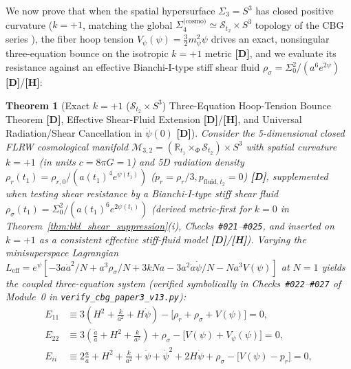 \documentclass[11pt,a4paper]{article}
\newcommand{\catD}{\textbf{\textcolor{blue!75!black}{[D]}}}
\newcommand{\catH}{\textbf{\textcolor{orange!85!black}{[H]}}}
\theoremstyle{plain}
\newtheorem{theorem}{Theorem}[section]
\theoremstyle{definition}
\theoremstyle{remark}
\numberwithin{equation}{section}
\begin{document}
We now prove that when the spatial hypersurface $\Sigma_3 = S^3$ has closed positive curvature ($k = +1$, matching the global $\Sigma_4^{\text{(cosmo)}} \simeq \mathcal{S}_{t_2} \times S^3$ topology of the CBG series \cite{jimenez2026_p0,jimenez2026a}), the fiber hoop tension $V_{\psi}(\psi) = \frac{3}{2}m_{\psi}^2\psi$ drives an exact, nonsingular three-equation bounce on the isotropic $k = +1$ metric \catD, and we evaluate its resistance against an effective Bianchi-I-type stiff shear fluid $\rho_{\sigma} = \Sigma_0^2/(a^6 e^{2\psi})$ \catD/\catH:

\begin{theorem}[Exact $k = +1$ ($\mathcal{S}_{t_2} \times S^3$) Three-Equation Hoop-Tension Bounce Theorem \catD, Effective Shear-Fluid Extension \catD/\catH, and Universal Radiation/Shear Cancellation in $\ddot{\psi}(0)$ \catD]
\label{thm:anisotropic_k1_bounce}
Consider the 5-dimensional closed FLRW cosmological manifold $\mathcal{M}_{3,2} = (\mathbb{R}_{t_1} \times_{\Phi} \mathcal{S}_{t_2}) \times S^3$ with spatial curvature $k = +1$ (in units $c = 8\pi G = 1$) and 5D radiation density $\rho_r(t_1) = \rho_{r,0}/(a(t_1)^4 e^{\psi(t_1)})$ ($p_r = \rho_r/3, p_{\text{fluid},t_2} = 0$) \catD, supplemented when testing shear resistance by a Bianchi-I-type stiff shear fluid $\rho_{\sigma}(t_1) = \Sigma_0^2/(a(t_1)^6 e^{2\psi(t_1)})$ (derived metric-first for $k = 0$ in Theorem~\ref{thm:bkl_shear_suppression}(i), Checks~\texttt{\#021}--\texttt{\#025}, and inserted on $k = +1$ as a consistent effective stiff-fluid model \catD/\catH). Varying the minisuperspace Lagrangian $L_{\text{eff}} = e^{\psi}[-3a\dot{a}^2/N + a^3\rho_{\sigma}/N + 3kNa - 3a^2\dot{a}\dot{\psi}/N - Na^3 V(\psi)]$ at $N = 1$ yields the coupled three-equation system (verified symbolically in Checks~\texttt{\#022}--\texttt{\#027} of Module~0 in \allowbreak\texttt{verify\_cbg\_paper3\_v13.py}):
\begin{subequations}
\label{eq:exact_3eq_aniso_system}
\begin{align}
  E_{11} &\equiv 3\left(H^2 + \frac{k}{a^2} + H\dot{\psi}\right) - \Big[\rho_r + \rho_{\sigma} + V(\psi)\Big] = 0, \label{eq:aniso_e11} \\[4pt]
  E_{22} &\equiv 3\left(\frac{\ddot{a}}{a} + H^2 + \frac{k}{a^2}\right) + \rho_{\sigma} - \Big[V(\psi) + V_{\psi}(\psi)\Big] = 0, \label{eq:aniso_e22} \\[4pt]
  E_{ii} &\equiv 2\frac{\ddot{a}}{a} + H^2 + \frac{k}{a^2} + \ddot{\psi} + \dot{\psi}^2 + 2H\dot{\psi} + \rho_{\sigma} - \Big[V(\psi) - p_r\Big] = 0,
  \label{eq:aniso_eii}

\end{align}
\end{subequations}
\end{theorem}
\end{document}
